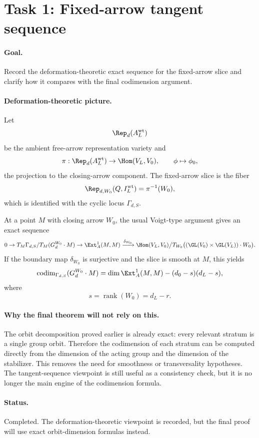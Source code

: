 \section*{Task 1: Fixed-arrow tangent sequence}

\paragraph{Goal.}
Record the deformation-theoretic exact sequence for the fixed-arrow slice and
clarify how it compares with the final codimension argument.

\paragraph{Deformation-theoretic picture.}
Let
\[
\Rep_d(A_L^{\mathrm{wt}})
\]
be the ambient free-arrow representation variety and
\[
\pi:\Rep_d(A_L^{\mathrm{wt}})\to \Hom(V_L,V_0),
\qquad
\phi\mapsto \phi_0,
\]
the projection to the closing-arrow component. The fixed-arrow slice is the
fiber
\[
\Rep_{d,W_0}(Q,I_L^{\mathrm{wt}})=\pi^{-1}(W_0),
\]
which is identified with the cyclic locus \(\Gamma_{d,S}\).

At a point \(M\) with closing arrow \(W_0\), the usual Voigt-type argument gives
an exact sequence
\[
0\to T_M\Gamma_{d,S}/T_M(G_d^{W_0}\cdot M)
\to \Ext_A^1(M,M)
\xrightarrow{\delta_{W_0}}
\Hom(V_L,V_0)\big/
T_{W_0}\bigl((\GL(V_0)\times \GL(V_L))\cdot W_0\bigr).
\]
If the boundary map \(\delta_{W_0}\) is surjective and the slice is smooth at
\(M\), this yields
\[
\operatorname{codim}_{\Gamma_{d,S}}(G_d^{W_0}\cdot M)
=
\dim \Ext_A^1(M,M)-(d_0-s)(d_L-s),
\]
where
\[
s=\operatorname{rank}(W_0)=d_L-r.
\]

\paragraph{Why the final theorem will not rely on this.}
The orbit decomposition proved earlier is already exact: every relevant stratum
is a single group orbit. Therefore the codimension of each stratum can be
computed directly from the dimension of the acting group and the dimension of
the stabilizer. This removes the need for smoothness or transversality
hypotheses. The tangent-sequence viewpoint is still useful as a consistency
check, but it is no longer the main engine of the codimension formula.

\paragraph{Status.}
Completed. The deformation-theoretic viewpoint is recorded, but the final proof
will use exact orbit-dimension formulas instead.
